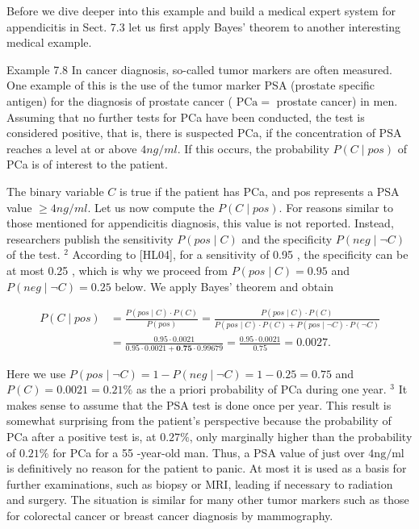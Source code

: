 \documentclass[10pt]{article}
\begin{document}
Before we dive deeper into this example and build a medical expert system for appendicitis in Sect. 7.3 let us first apply Bayes' theorem to another interesting medical example.

Example 7.8 In cancer diagnosis, so-called tumor markers are often measured. One example of this is the use of the tumor marker PSA (prostate specific antigen) for the diagnosis of prostate cancer ( $\mathrm{PCa}=$ prostate cancer) in men. Assuming that no further tests for PCa have been conducted, the test is considered positive, that is, there is suspected PCa, if the concentration of PSA reaches a level at or above $4 n g / m l$. If this occurs, the probability $P(C \mid p o s)$ of PCa is of interest to the patient.

The binary variable $C$ is true if the patient has PCa, and pos represents a PSA value $\geq 4 n g / m l$. Let us now compute the $P(C \mid p o s)$. For reasons similar to those mentioned for appendicitis diagnosis, this value is not reported. Instead, researchers publish the sensitivity $P(p o s \mid C)$ and the specificity $P(n e g \mid \neg C)$ of the test. ${ }^{2}$ According to [HL04], for a sensitivity of 0.95 , the specificity can be at most 0.25 , which is why we proceed from $P(p o s \mid C)=0.95$ and $P(n e g \mid \neg C)=0.25$ below. We apply Bayes' theorem and obtain

$$
\begin{aligned}
P(C \mid p o s) & =\frac{P(p o s \mid C) \cdot P(C)}{P(p o s)}=\frac{P(p o s \mid C) \cdot P(C)}{P(p o s \mid C) \cdot P(C)+P(p o s \mid \neg C) \cdot P(\neg C)} \\
& =\frac{0.95 \cdot 0.0021}{0.95 \cdot 0.0021+\mathbf{0 . 7 5} \cdot 0.99679}=\frac{0.95 \cdot 0.0021}{0.75}=0.0027 .
\end{aligned}
$$

Here we use $P(p o s \mid \neg C)=1-P(n e g \mid \neg C)=1-0.25=0.75$ and $P(C)= 0.0021=0.21 \%$ as the a priori probability of PCa during one year. ${ }^{3}$ It makes sense to assume that the PSA test is done once per year. This result is somewhat surprising from the patient's perspective because the probability of PCa after a positive test is, at $0.27 \%$, only marginally higher than the probability of $0.21 \%$ for PCa for a 55 -year-old man. Thus, a PSA value of just over $4 \mathrm{ng} / \mathrm{ml}$ is definitively no reason for the patient to panic. At most it is used as a basis for further examinations, such as biopsy or MRI, leading if necessary to radiation and surgery. The situation is similar for many other tumor markers such as those for colorectal cancer or breast cancer diagnosis by mammography.
\end{document}
